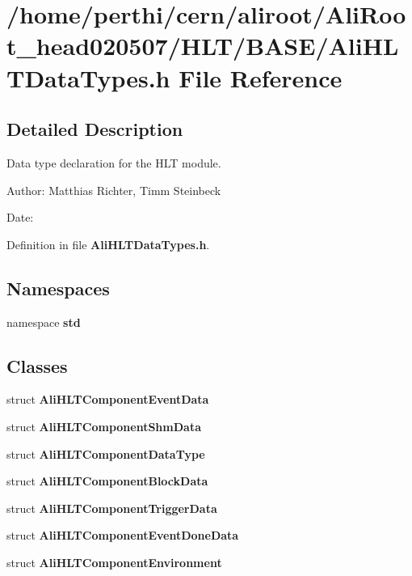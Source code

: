 \section{/home/perthi/cern/aliroot/Ali\-Root\_\-head020507/HLT/BASE/Ali\-HLTData\-Types.h File Reference}
\label{AliHLTDataTypes_8h}


\subsection{Detailed Description}
Data type declaration for the HLT module. 

\begin{Desc}
\item[Author:]Matthias Richter, Timm Steinbeck \end{Desc}
\begin{Desc}
\item[Date:]\end{Desc}


Definition in file {\bf Ali\-HLTData\-Types.h}.

\subsection*{Namespaces}
\begin{CompactItemize}
\item 
namespace {\bf std}
\end{CompactItemize}
\subsection*{Classes}
\begin{CompactItemize}
\item 
struct {\bf Ali\-HLTComponent\-Event\-Data}
\item 
struct {\bf Ali\-HLTComponent\-Shm\-Data}
\item 
struct {\bf Ali\-HLTComponent\-Data\-Type}
\item 
struct {\bf Ali\-HLTComponent\-Block\-Data}
\item 
struct {\bf Ali\-HLTComponent\-Trigger\-Data}
\item 
struct {\bf Ali\-HLTComponent\-Event\-Done\-Data}
\item 
struct {\bf Ali\-HLTComponent\-Environment}
\end{CompactItemize}
